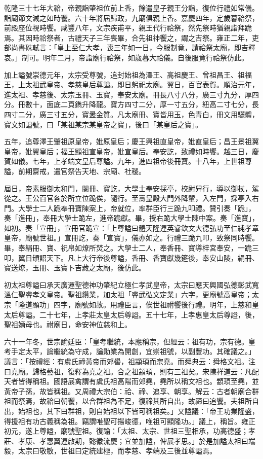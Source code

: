 \begin{pinyinscope}
乾隆三十七年大祫，帝親詣肇祖位前上香，餘遣皇子親王分詣，復位行禮如常儀。詣廟節文減之如時饗。六十年將屆歸政，九廟俱親上香。嘉慶四年，定歲暮祫祭，前殿座位視時饗。咸豐八年，文宗疾甫平，親王代行祫祭，然先祭時猶親詣拜跪焉。其因時祫祭者，古禮天子三年喪畢，合先祖神饗之，謂之吉祭。雍正二年，吏部尚書硃軾言：「皇上至仁大孝，喪三年如一日，今服制竟，請祫祭太廟，即吉釋哀。」制可。明年二月，帝詣廟行祫祭，如歲暮大祫儀。自後服竟行祫祭仿此。

加上謚號崇德元年，太宗受尊號，追封始祖為澤王、高祖慶王、曾祖昌王、祖福王，上太祖武皇帝、孝慈皇后尊謚。即日躬祀太廟。翼日，百官表賀。順治元年，進太祖、孝慈後、太宗玉冊、玉寶，奉安太廟。冊長八寸八分，廣三寸九分，厚四分。冊數十，面底二頁鐫升降龍。寶方四寸二分，厚一寸五分，紐高二寸七分，長四寸二分，廣三寸五分，寶盝金質。凡太廟冊、寶皆用玉，色青白，冊文用驪體，寶文如謚號，曰「某祖某宗某皇帝之寶」，後曰「某皇后之寶」。

五年，追尊澤王肇祖原皇帝，妣原皇后；慶王興祖直皇帝，妣直皇后；昌王景祖翼皇帝，妣翼皇后；福王顯祖宣皇帝，妣宣皇后。奉安訖，致禮如時饗。越三日，慶賀如儀。七年，上孝端文皇后尊謚。九年，進四祖帝後冊寶。十八年，上世祖尊謚，前期齋戒，遣官祭告天地、宗廟、社稷。

屆日，帝素服御太和門，閱冊、寶訖，大學士奉安採亭，校尉舁行，導以御杖，駕從之。王公百官各於所立位跪俟，隨行。至壽皇殿大門外降輦，入左門，採亭入右門。大學士二人跪奉冊寶陳案上，帝就位，率群臣行三跪九叩禮。贊引奏「跪」，奏「進冊」，奉冊大學士跪左，進帝跪獻。畢，授右跪大學士陳中案。奏「進寶」，如初。奏「宣冊」，宣冊官跪宣：「上尊謚曰體天隆運英睿欽文大德弘功至仁純孝章皇帝，廟號世祖。」宣冊訖，奏「宣寶」，儀亦如之。行禮三跪九叩，致祭同時饗。畢，奉絹冊、寶、祝帛如燎所焚之。大學士二人，奉香冊、寶導梓宮奉安，一跪三叩，翼日頒詔天下。凡上大行帝後尊謚，香冊、香寶獻幾筵後，奉安山陵，絹冊、寶送燎，玉冊、玉寶卜吉藏之太廟，後仿此。

初太祖尊謚曰承天廣運聖德神功肇紀立極仁孝武皇帝，太宗曰應天興國弘德彰武寬溫仁聖睿孝文皇帝。聖祖纘業，加太祖「睿武弘文定業」六字，更廟號高皇帝；太宗「隆道顯功」四字，廟號如故。用禮臣言，俟世祖祔饗後行禮。明年，上慈和皇太后尊謚。二十七年，上孝莊太皇太后尊謚。五十七年，上孝惠皇太后尊謚，後，聖祖嫡母也。祔廟日，命安神位慈和上。

六十一年冬，世宗諭廷臣：「皇考繼統，本應稱宗，但經云：祖有功，宗有德。皇考手定太平，論繼統為守成，論勛業為開創，宜崇祖號，以副豐功。其確議之。」議言：「按禮經：有虞氏禘黃帝而郊嚳，祖顓頊而宗堯。而舜典云：舜格文祖。注曰堯廟。歸格藝祖，復釋為堯之祖。合之祖顓頊，則有三祖矣。宋陳祥道云：凡配天者皆得稱祖。國語展禽謂有虞氏祖高陽而郊堯，堯所以稱文祖也。顓頊至堯，並黃帝子孫，故皆稱祖。又周禮大宗伯：祫、禘、追享、朝享。解云：古者朝廟合群祖而祭焉，故祫曰朝饗，以合群祖為不足，復禘其所自出，故禘曰追饗。夫祖所自出，始祖也，其下曰群祖，則自始祖以下皆可稱祖矣。」又謚議：「帝王功業隆盛，得援祖有功古義稱為祖。竊謂唯聖可揚峻德，唯祖可顯隆功。」議上，稱旨。雍正初元，遂上尊謚，廟號聖祖。復諭：「太祖、太宗、世祖三聖相承，功高德盛；孝莊、孝康、孝惠翼運啟期，懿徽流慶；宜並加謚，俾展孝思。」於是加謚太祖曰端毅，太宗曰敬敏，世祖曰定統建極，而孝慈、孝端及三後並尊謚焉。


\end{pinyinscope}
